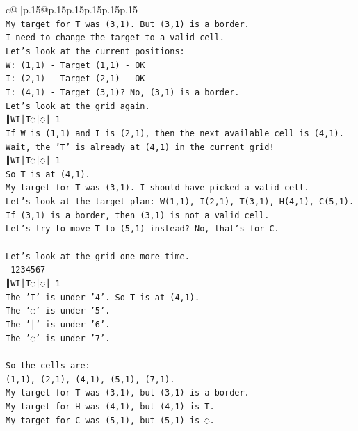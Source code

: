 \documentclass{article}
\begin{document}
{\begin{supertabular}{c@{$\;$}|p{.15\linewidth}@{}p{.15\linewidth}p{.15\linewidth}p{.15\linewidth}p{.15\linewidth}p{.15\linewidth}}
{{{\\ 
\texttt{My target for T was (3,1). But (3,1) is a border.} \\
\texttt{I need to change the target to a valid cell.} \\
\texttt{Let's look at the current positions:} \\
\texttt{W: (1,1) {-} Target (1,1) {-} OK} \\
\texttt{I: (2,1) {-} Target (2,1) {-} OK} \\
\texttt{T: (4,1) {-} Target (3,1)? No, (3,1) is a border.} \\
\texttt{Let's look at the grid again.} \\
\texttt{║WI│T◌│◌║ 1} \\
\texttt{If W is (1,1) and I is (2,1), then the next available cell is (4,1).} \\
\texttt{Wait, the 'T' is already at (4,1) in the current grid!} \\
\texttt{║WI│T◌│◌║ 1} \\
\texttt{So T is at (4,1).} \\
\texttt{My target for T was (3,1). I should have picked a valid cell.} \\
\texttt{Let's look at the target plan: W(1,1), I(2,1), T(3,1), H(4,1), C(5,1).} \\
\texttt{If (3,1) is a border, then (3,1) is not a valid cell.} \\
\texttt{Let's try to move T to (5,1) instead? No, that's for C.} \\
\\ 
\texttt{Let's look at the grid one more time.} \\
\texttt{ 1234567} \\
\texttt{║WI│T◌│◌║ 1} \\
\texttt{The 'T' is under '4'. So T is at (4,1).} \\
\texttt{The '◌' is under '5'.} \\
\texttt{The '│' is under '6'.} \\
\texttt{The '◌' is under '7'.} \\
\\ 
\texttt{So the cells are:} \\
\texttt{(1,1), (2,1), (4,1), (5,1), (7,1).} \\
\texttt{My target for T was (3,1), but (3,1) is a border.} \\
\texttt{My target for H was (4,1), but (4,1) is T.} \\
\texttt{My target for C was (5,1), but (5,1) is ◌.} \\
}}}
\end{supertabular}}
\end{document}
